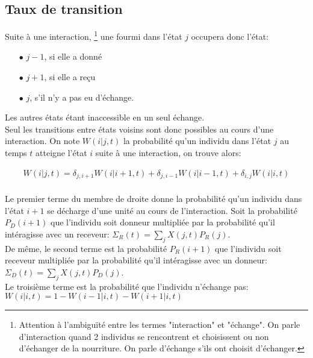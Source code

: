 \subsection{Taux de transition}
Suite à une interaction,
\footnote{Attention à l'ambiguïté entre les termes "interaction" et "échange". On parle d'interaction quand 2 individus se rencontrent et choisissent ou non d'échanger de la nourriture. On parle d'échange s'ils ont choisit d'échanger.}
une fourmi dans l'état $j$ occupera donc l'état:
\begin{itemize}
\item[$\bullet$] $j-1$, si elle a donné
\item[$\bullet$] $j+1$, si elle a reçu
\item[$\bullet$] $j$, s'il n'y a pas eu d'échange.
\end{itemize}
Les autres états étant inaccessible en un seul échange.\\

Seul les transitions entre états voisins sont donc possibles au cours d'une interaction. On note $W(i|j,t)$ la probabilité qu'un individu dans l'état $j$ au temps $t$ atteigne l'état $i$ suite à une interaction, on trouve alors:


\begin{equation}
\begin{aligned}
W(i|j,t) = \delta_{j,i+1} W(i|i+1,t) + \delta_{j,i-1} W(i|i-1,t) + \delta_{i,j} W(i|i,t)\\
\label{Wij}
\end{aligned}
\end{equation}


Le premier terme du membre de droite donne la probabilité qu'un individu dans l'état $i+1$ se décharge d'une unité au cours de l'interaction. Soit la probabilité $P_D(i+1)$ que l'individu soit donneur multipliée par la probabilité qu'il intéragisse avec un receveur: $\Sigma_R(t) = \sum_j X(j,t) P_R(j)$.\\
De même, le second terme est la probabilité $P_R(i+1)$ que l'individu soit receveur multipliée par la probabilité qu'il intéragisse avec un donneur: $\Sigma_D(t) = \sum_j X(j,t) P_D(j)$.\\
Le troisième terme est la probabilité que l'individu n'échange pas: $W(i|i,t) = 1 - W(i-1|i,t)- W(i+1|i,t)$\\


